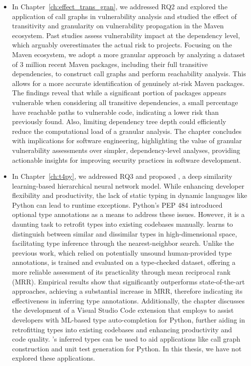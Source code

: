 \begin{itemize}
    \item In Chapter~\ref{ch:effect_trans_gran}, we addressed RQ2 and explored the application of call graphs in vulnerability analysis and studied the effect of transitivity and granularity on vulnerability propagation in the Maven ecosystem. Past studies assess vulnerability impact at the dependency level, which arguably overestimates the actual risk to projects. Focusing on the Maven ecosystem, we adopt a more granular approach by analyzing a dataset of 3 million recent Maven packages, including their full transitive dependencies, to construct call graphs and perform reachability analysis. This allows for a more accurate identification of genuinely at-risk Maven packages. The findings reveal that while a significant portion of packages appears vulnerable when considering all transitive dependencies, a small percentage have reachable paths to vulnerable code, indicating a lower risk than previously found. Also, limiting dependency tree depth could efficiently reduce the computational load of a granular analysis. The chapter concludes with implications for software engineering, highlighting the value of granular vulnerability assessments over simpler, dependency-level analyses, providing actionable insights for improving security practices in software development. 

    \item In Chapter~\ref{ch:t4py}, we addressed RQ3 and proposed , a deep similarity learning-based hierarchical neural network model. While enhancing developer flexibility and productivity, the lack of static typing in dynamic languages like Python can lead to runtime exceptions. Python's PEP 484 introduced optional type annotations as a means to address these issues. However, it is a daunting task to retrofit types into existing codebases manually.  learns to distinguish between similar and dissimilar types in high-dimensional space, facilitating type inference through the nearest-neighbor search. Unlike the previous work, which relied on potentially unsound human-provided type annotations,  is trained and evaluated on a type-checked dataset, offering a more reliable assessment of its practicality through mean reciprocal rank (MRR). Empirical results show that  significantly outperforms state-of-the-art approaches, achieving a substantial increase in MRR, therefore indicating its effectiveness in inferring type annotations. Additionally, the chapter discusses the development of a Visual Studio Code extension that employs  to assist developers with ML-based type auto-completion for Python, further aiding in retrofitting types into existing codebases and enhancing productivity and code quality. 's inferred types can be used to aid applications like call graph construction and unit test generation for Python. In this thesis, we have not explored these applications. 
\end{itemize}

